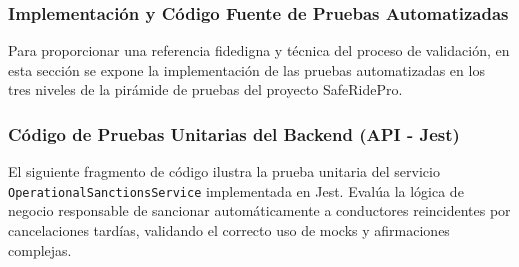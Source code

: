\documentclass{article}
\begin{document}
\subsubsection{Implementación y Código Fuente de Pruebas Automatizadas}

Para proporcionar una referencia fidedigna y técnica del proceso de validación, en esta sección se expone la implementación de las pruebas automatizadas en los tres niveles de la pirámide de pruebas del proyecto SafeRidePro.

\subsubsection*{Código de Pruebas Unitarias del Backend (API - Jest)}
El siguiente fragmento de código ilustra la prueba unitaria del servicio \texttt{OperationalSanctionsService} implementada en Jest. Evalúa la lógica de negocio responsable de sancionar automáticamente a conductores reincidentes por cancelaciones tardías, validando el correcto uso de mocks y afirmaciones complejas.
\end{document}

